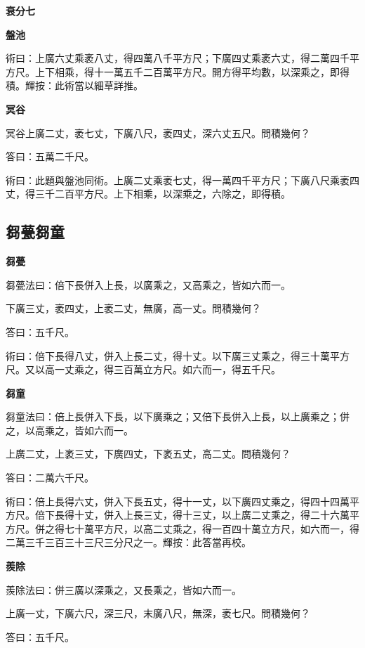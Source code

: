 \documentclass[11pt,a4paper]{article}
\newenvironment{problemenv}[1]{%
  \medskip\noindent\textbf{#1}\par\nopagebreak\smallskip
}{\medskip}
\begin{document}
\begin{problemenv}{衰分七}
\begin{problemenv}{盤池}
\textsf{術曰：}上廣六丈乘袤八丈，得四萬八千平方尺；下廣四丈乘袤六丈，得二萬四千平方尺。上下相乘，得十一萬五千二百萬平方尺。開方得平均數，以深乘之，即得積。輝按：此術當以細草詳推。
\end{problemenv}

\begin{problemenv}{冥谷}
冥谷上廣二丈，袤七丈，下廣八尺，袤四丈，深六丈五尺。問積幾何？

\textsf{答曰：}五萬二千尺。

\textsf{術曰：}此題與盤池同術。上廣二丈乘袤七丈，得一萬四千平方尺；下廣八尺乘袤四丈，得三千二百平方尺。上下相乘，以深乘之，六除之，即得積。
\end{problemenv}

\subsection{芻甍芻童}

\begin{problemenv}{芻甍}
芻甍法曰：倍下長併入上長，以廣乘之，又高乘之，皆如六而一。

下廣三丈，袤四丈，上袤二丈，無廣，高一丈。問積幾何？

\textsf{答曰：}五千尺。

\textsf{術曰：}倍下長得八丈，併入上長二丈，得十丈。以下廣三丈乘之，得三十萬平方尺。又以高一丈乘之，得三百萬立方尺。如六而一，得五千尺。
\end{problemenv}

\begin{problemenv}{芻童}
芻童法曰：倍上長併入下長，以下廣乘之；又倍下長併入上長，以上廣乘之；併之，以高乘之，皆如六而一。

上廣二丈，上袤三丈，下廣四丈，下袤五丈，高二丈。問積幾何？

\textsf{答曰：}二萬六千尺。

\textsf{術曰：}倍上長得六丈，併入下長五丈，得十一丈，以下廣四丈乘之，得四十四萬平方尺。倍下長得十丈，併入上長三丈，得十三丈，以上廣二丈乘之，得二十六萬平方尺。併之得七十萬平方尺，以高二丈乘之，得一百四十萬立方尺，如六而一，得二萬三千三百三十三尺三分尺之一。輝按：此答當再校。
\end{problemenv}

\begin{problemenv}{羨除}
羨除法曰：併三廣以深乘之，又長乘之，皆如六而一。

上廣一丈，下廣六尺，深三尺，末廣八尺，無深，袤七尺。問積幾何？

\textsf{答曰：}五千尺。


\end{problemenv}
\end{problemenv}
\end{document}
